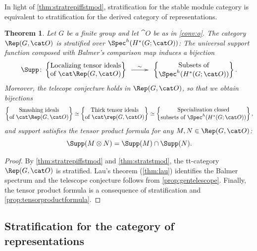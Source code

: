 \documentclass{amsart}%
\numberwithin{equation}{section}%
\newtheorem{Thm}[equation]{Theorem}
\theoremstyle{remark}
\begin{document}
In light of \cref{thm:stratrepiffstmod}, stratification for the stable module category is equivalent to stratification for the derived category of representations. 

\begin{Thm}\label{thm:stratrep}
Let $G$ be a finite group and let $\cat O$ be as in \cref{conv:o}. The category $\Rep(G,\cat O)$ is stratified over $\Spec^h(H^*(G;\cat O))$: The universal support function composed with Balmer's comparison map induces a bijection
\[
\Supp\colon\begin{Bmatrix}
\text{Localizing tensor ideals} \\
\text{of } \cat \Rep(G,\cat O)
\end{Bmatrix} 
\xymatrix@C=2pc{ \ar[r]^-{\sim} &}
\begin{Bmatrix}
\text{Subsets of}  \\
\Spec^h(H^*(G;\cat O))
\end{Bmatrix}.
\]
Moreover, the telecope conjecture holds in $\Rep(G,\cat O)$, so that we obtain bijections
\[
\begin{Bmatrix}
\text{Smashing ideals} \\
\text{of } \cat \Rep(G,\cat O)
\end{Bmatrix} 
\simeq
\begin{Bmatrix}
\text{Thick tensor ideals} \\
\text{of } \cat \rep(G,\cat O)
\end{Bmatrix} 
\simeq
\begin{Bmatrix}
\text{Specialization closed}  \\
\text{subsets of } \Spec^h(H^*(G;\cat O))
\end{Bmatrix},
\]
and support satisfies the tensor product formula for any $M,N \in \Rep(G,\cat O)$:
\[
\Supp(M \otimes N) = \Supp(M) \cap \Supp(N).
\]
\end{Thm}
\begin{proof}
By \cref{thm:stratrepiffstmod} and \cref{thm:stratstmod}, the tt-category $\Rep(G,\cat O)$ is stratified. Lau's theorem (\cref{thm:lau}) identifies the Balmer spectrum and the telescope conjecture follows from  \cref{prop:gentelescope}. Finally, the tensor product formula is a consequence of stratification and \cref{prop:tensorproductformula}.
\end{proof}



\subsection{Stratification for the category of representations}\label{ssec:stratreps}
\end{document}
